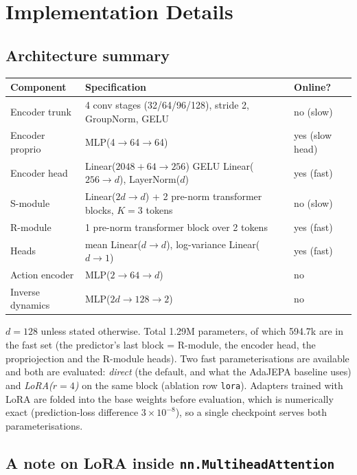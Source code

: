 \section{Implementation Details}

\subsection{Architecture summary}

\begin{center}
\begin{tabular}{lll}
\toprule
Component & Specification & Online? \\
\midrule
Encoder trunk & 4 conv stages (32/64/96/128), stride 2, GroupNorm, GELU & no (slow)\\
Encoder proprio & MLP(4$\to$64$\to$64) & yes (slow head)\\
Encoder head & Linear($2048{+}64\to256$) GELU Linear($256\to d$), LayerNorm($d$) & yes (fast)\\
S-module & Linear($2d\to d$) + 2 pre-norm transformer blocks, $K=3$ tokens & no (slow)\\
R-module & 1 pre-norm transformer block over 2 tokens & yes (fast)\\
Heads & mean Linear($d\to d$), log-variance Linear($d\to1$) & yes (fast)\\
Action encoder & MLP($2\to64\to d$) & no\\
Inverse dynamics & MLP($2d\to128\to2$) & no\\
\bottomrule
\end{tabular}
\end{center}

$d=128$ unless stated otherwise. Total 1.29M parameters, of which 594.7k are in the fast set
(the predictor's last block = R-module, the encoder head, the propriojection and the R-module
heads). Two fast parameterisations are available and both are evaluated: \emph{direct} (the
default, and what the AdaJEPA baseline uses) and \emph{LoRA($r{=}4$)} on the same block
(ablation row \texttt{lora}). Adapters trained with LoRA are folded into the base weights
before evaluation, which is numerically exact (prediction-loss difference $3\times10^{-8}$),
so a single checkpoint serves both parameterisations.

\subsection{A note on LoRA inside \texttt{nn.MultiheadAttention}}


